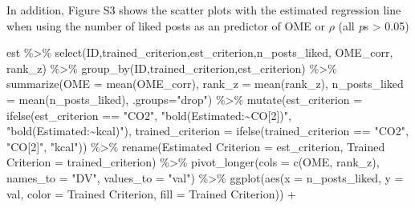 \documentclass[
  letterpaper,
  DIV=11,
  numbers=noendperiod]{scrartcl}
\newenvironment{Shaded}{\begin{snugshade}}{\end{snugshade}}
\newcommand{\AttributeTok}[1]{\textcolor[rgb]{0.40,0.45,0.13}{#1}}
\newcommand{\FunctionTok}[1]{\textcolor[rgb]{0.28,0.35,0.67}{#1}}
\newcommand{\NormalTok}[1]{\textcolor[rgb]{0.00,0.23,0.31}{#1}}
\newcommand{\OtherTok}[1]{\textcolor[rgb]{0.00,0.23,0.31}{#1}}
\newcommand{\SpecialCharTok}[1]{\textcolor[rgb]{0.37,0.37,0.37}{#1}}
\newcommand{\StringTok}[1]{\textcolor[rgb]{0.13,0.47,0.30}{#1}}
\begin{document}
In addition, Figure S3 shows the scatter plots with the estimated
regression line when using the number of liked posts as an predictor of
OME or \(\rho\) (all \emph{p}s \textgreater{} 0.05)

\begin{Shaded}
\begin{Highlighting}[]
\NormalTok{est }\SpecialCharTok{\%\textgreater{}\%} 
 \FunctionTok{select}\NormalTok{(ID,trained\_criterion,est\_criterion,n\_posts\_liked, OME\_corr, rank\_z) }\SpecialCharTok{\%\textgreater{}\%} 
 \FunctionTok{group\_by}\NormalTok{(ID,trained\_criterion,est\_criterion) }\SpecialCharTok{\%\textgreater{}\%} 
 \FunctionTok{summarize}\NormalTok{(}\AttributeTok{OME    =} \FunctionTok{mean}\NormalTok{(OME\_corr),}
           \AttributeTok{rank\_z =} \FunctionTok{mean}\NormalTok{(rank\_z),}
           \AttributeTok{n\_posts\_liked =} \FunctionTok{mean}\NormalTok{(n\_posts\_liked),}
           \AttributeTok{.groups=}\StringTok{"drop"}\NormalTok{) }\SpecialCharTok{\%\textgreater{}\%} 
  \FunctionTok{mutate}\NormalTok{(}\AttributeTok{est\_criterion =} \FunctionTok{ifelse}\NormalTok{(est\_criterion }\SpecialCharTok{==} \StringTok{"CO2"}\NormalTok{,}
                                \StringTok{"bold(Estimated:\textasciitilde{}CO[2])"}\NormalTok{,}
                                \StringTok{"bold(Estimated:\textasciitilde{}kcal)"}\NormalTok{),}
         \AttributeTok{trained\_criterion =} \FunctionTok{ifelse}\NormalTok{(trained\_criterion }\SpecialCharTok{==} \StringTok{"CO2"}\NormalTok{,}
                                    \StringTok{"CO[2]"}\NormalTok{,}
                                    \StringTok{"kcal"}\NormalTok{)) }\SpecialCharTok{\%\textgreater{}\%} 
  \FunctionTok{rename}\NormalTok{(}\StringTok{\textasciigrave{}}\AttributeTok{Estimated Criterion}\StringTok{\textasciigrave{}} \OtherTok{=}\NormalTok{ est\_criterion,}
         \StringTok{\textasciigrave{}}\AttributeTok{Trained Criterion}\StringTok{\textasciigrave{}}   \OtherTok{=}\NormalTok{ trained\_criterion) }\SpecialCharTok{\%\textgreater{}\%} 
  \FunctionTok{pivot\_longer}\NormalTok{(}\AttributeTok{cols =} \FunctionTok{c}\NormalTok{(OME, rank\_z), }\AttributeTok{names\_to =} \StringTok{"DV"}\NormalTok{, }\AttributeTok{values\_to =} \StringTok{"val"}\NormalTok{) }\SpecialCharTok{\%\textgreater{}\%} 
  \FunctionTok{ggplot}\NormalTok{(}\FunctionTok{aes}\NormalTok{(}\AttributeTok{x =}\NormalTok{ n\_posts\_liked, }\AttributeTok{y =}\NormalTok{ val,}
             \AttributeTok{color =} \StringTok{\textasciigrave{}}\AttributeTok{Trained Criterion}\StringTok{\textasciigrave{}}\NormalTok{, }\AttributeTok{fill =} \StringTok{\textasciigrave{}}\AttributeTok{Trained Criterion}\StringTok{\textasciigrave{}}\NormalTok{)) }\SpecialCharTok{+}

\end{Highlighting}
\end{Shaded}
\end{document}
